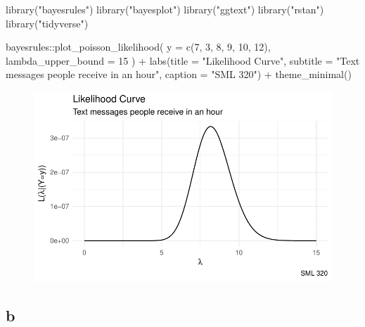 \documentclass[
  letterpaper,
  DIV=11,
  numbers=noendperiod]{scrartcl}
\newenvironment{Shaded}{\begin{snugshade}}{\end{snugshade}}
\newcommand{\AttributeTok}[1]{\textcolor[rgb]{0.40,0.45,0.13}{#1}}
\newcommand{\DecValTok}[1]{\textcolor[rgb]{0.68,0.00,0.00}{#1}}
\newcommand{\FunctionTok}[1]{\textcolor[rgb]{0.28,0.35,0.67}{#1}}
\newcommand{\NormalTok}[1]{\textcolor[rgb]{0.00,0.23,0.31}{#1}}
\newcommand{\SpecialCharTok}[1]{\textcolor[rgb]{0.37,0.37,0.37}{#1}}
\newcommand{\StringTok}[1]{\textcolor[rgb]{0.13,0.47,0.30}{#1}}
\begin{document}
\begin{Shaded}
\begin{Highlighting}[]
\FunctionTok{library}\NormalTok{(}\StringTok{"bayesrules"}\NormalTok{)}
\FunctionTok{library}\NormalTok{(}\StringTok{"bayesplot"}\NormalTok{)}
\FunctionTok{library}\NormalTok{(}\StringTok{"ggtext"}\NormalTok{)}
\FunctionTok{library}\NormalTok{(}\StringTok{"rstan"}\NormalTok{)}
\FunctionTok{library}\NormalTok{(}\StringTok{"tidyverse"}\NormalTok{)}

\NormalTok{bayesrules}\SpecialCharTok{::}\FunctionTok{plot\_poisson\_likelihood}\NormalTok{(}
  \AttributeTok{y =} \FunctionTok{c}\NormalTok{(}\DecValTok{7}\NormalTok{, }\DecValTok{3}\NormalTok{, }\DecValTok{8}\NormalTok{, }\DecValTok{9}\NormalTok{, }\DecValTok{10}\NormalTok{, }\DecValTok{12}\NormalTok{),}
  \AttributeTok{lambda\_upper\_bound =} \DecValTok{15}
\NormalTok{) }\SpecialCharTok{+}
  \FunctionTok{labs}\NormalTok{(}\AttributeTok{title =} \StringTok{"Likelihood Curve"}\NormalTok{,}
       \AttributeTok{subtitle =} \StringTok{"Text messages people receive in an hour"}\NormalTok{,}
       \AttributeTok{caption =} \StringTok{"SML 320"}\NormalTok{) }\SpecialCharTok{+}
  \FunctionTok{theme\_minimal}\NormalTok{()}
\end{Highlighting}
\end{Shaded}

\begin{figure}[H]

{\centering \includegraphics{ps4_code_files/figure-pdf/unnamed-chunk-1-1.pdf}

}

\end{figure}

\hypertarget{b-1}{%
\subsection{b}\label{b-1}}
\end{document}
